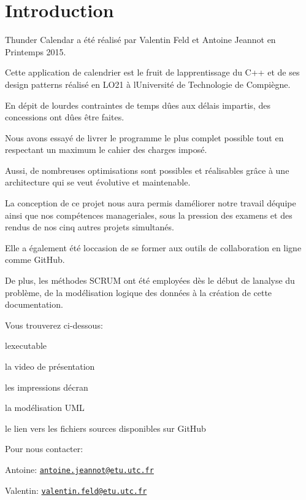 \hypertarget{index_Introduction}{}\section{Introduction}\label{index_Introduction}
Thunder Calendar a été réalisé par Valentin Feld et Antoine Jeannot en Printemps 2015.

Cette application de calendrier est le fruit de l\textquotesingle{}apprentissage du C++ et de ses design patterns réalisé en L\+O21 à l\textquotesingle{}Université de Technologie de Compiègne.

En dépit de lourdes contraintes de temps dûes aux délais impartis, des concessions ont dûes être faites.

Nous avons essayé de livrer le programme le plus complet possible tout en respectant un maximum le cahier des charges imposé.

Aussi, de nombreuses optimisations sont possibles et réalisables grâce à une architecture qui se veut évolutive et maintenable.

La conception de ce projet nous aura permis d\textquotesingle{}améliorer notre travail d\textquotesingle{}équipe ainsi que nos compétences manageriales, sous la pression des examens et des rendus de nos cinq autres projets simultanés.

Elle a également été l\textquotesingle{}occasion de se former aux outils de collaboration en ligne comme Git\+Hub.

De plus, les méthodes S\+C\+R\+U\+M ont été employées dès le début de l\textquotesingle{}analyse du problème, de la modélisation logique des données à la création de cette documentation.

Vous trouverez ci-\/dessous\+:
\begin{DoxyItemize}
\item l\textquotesingle{}executable
\item la video de présentation
\item les impressions d\textquotesingle{}écran
\item la modélisation U\+M\+L
\item le lien vers les fichiers sources disponibles sur Git\+Hub
\end{DoxyItemize}

Pour nous contacter\+:
\begin{DoxyItemize}
\item Antoine\+: \href{mailto:antoine.jeannot@etu.utc.fr}{\tt antoine.\+jeannot@etu.\+utc.\+fr}
\item Valentin\+: \href{mailto:valentin.feld@etu.utc.fr}{\tt valentin.\+feld@etu.\+utc.\+fr} 
\end{DoxyItemize}